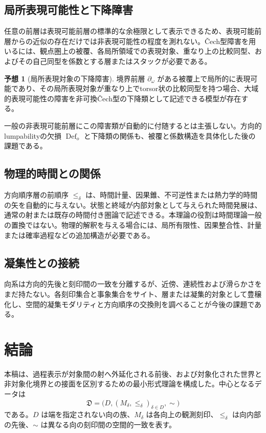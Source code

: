 \documentclass[a4paper,11pt]{ltjsarticle}
\theoremstyle{definition}
\newtheorem{conjecture}[definition]{予想}
\theoremstyle{plain}
\newcommand{\Def}{\operatorname{Def}}
\begin{document}
\subsection{局所表現可能性と下降障害}

任意の前層は表現可能前層の標準的な余極限として表示できるため\cite{MacLane1998,Riehl2016}、表現可能前層からの近似の存在だけでは非表現可能性の程度を測れない。Čech型障害を用いるには、観点圏上の被覆、各局所領域での表現対象、重なり上の比較同型、およびその自己同型を係数とする層またはスタックが必要である\cite{johnstone}。

\begin{conjecture}[局所表現対象の下降障害]
境界前層 $\partial_\omega$ がある被覆上で局所的に表現可能であり、その局所表現対象が重なり上でtorsor状の比較同型を持つ場合、大域的表現可能性の障害を非可換Čech型の下降類として記述できる模型が存在する。
\end{conjecture}

一般の非表現可能前層にこの障害類が自動的に付随するとは主張しない。方向的lumpabilityの欠損 $\Def_o$ と下降類の関係も、被覆と係数構造を具体化した後の課題である。

\subsection{物理的時間との関係}

方向順序層の前順序 $\leq_\delta$ は、時間計量、因果錐、不可逆性または熱力学的時間の矢を自動的に与えない。状態と終域が内部対象として与えられた時間発展は、通常の射または既存の時間付き圏論で記述できる。本理論の役割は時間理論一般の置換ではない。物理的解釈を与える場合には、局所有限性、因果整合性、計量または確率過程などの追加構造が必要である。

\subsection{凝集性との接続}

向系は方向的先後と刻印間の一致を分離するが、近傍、連続性および滑らかさをまだ持たない。各刻印集合と事象集合をサイト、層または凝集的対象として豊穣化し、空間的凝集モダリティと方向順序の交換則を調べることが今後の課題である。

\section{結論}

本稿は、過程表示が対象間の射へ外延化される前後、および対象化された世界と非対象化境界との接面を区別するための最小形式理論を構成した。中心となるデータは
\[
 \boxed{
 \mathfrak D=
 \bigl(D,(M_\delta,\leq_\delta)_{\delta\in D},\sim\bigr)
 }
\]
である。$D$ は端を指定されない向の族、$M_\delta$ は各向上の観測刻印、$\leq_\delta$ は向内部の先後、$\sim$ は異なる向の刻印間の空間的一致を表す。
\end{document}
